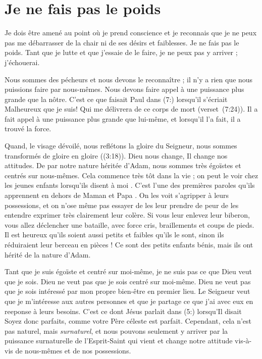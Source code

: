 \section{Je ne fais pas le poids}

Je dois être amené au point où je prend conscience et
 je reconnais que je ne peux pas me débarrasser de la chair
 ni de ses désirs et faiblesses.
 Je ne fais pas le poids. Tant que je lutte et que j'essaie de le faire,
 je ne peux pas y arriver ; j'échouerai.

Nous sommes des pécheurs et nous devons le reconnaître ;
 il n'y a rien que nous puissions faire par nous-mêmes.
 Nous devons faire appel à une puissance plus grande que la nôtre.
 C'est ce que faisait Paul dans (7:) lorsqu'il s'écriait\frcolon{}
 \Og Malheureux que je suis! Qui me délivrera de ce corps de mort \Fg{}
 (verset~(7:24)).
 Il a fait appel à une puissance plus grande que lui-même,
 et lorsqu'il l'a fait, il a trouvé la force.

\Og Quand, le visage dévoilé, nous reflétons la gloire du Seigneur,
nous sommes transformés de gloire en gloire \Fg{} ((3:18)).
 Dieu nous change, Il change nos attitudes.
 De par notre nature héritée d'Adam, nous sommes très égoïstes
 et centrés sur nous-mêmes.
 Cela commence très tôt dans la vie ; on peut le voir chez les jeunes enfants
 lorsqu'ils disent \Og à moi \Fg{}.
 C'est l'une des premières paroles qu'ils apprennent
 en dehors de \Og Maman \Fg{} et \Og Papa \Fg{}.
 On les voit s'agripper à leurs possessions, et on n'ose même pas
 essayer de les leur prendre de peur de les entendre exprimer très clairement leur colère.
 Si vous leur enlevez leur biberon, vous allez déclencher une bataille,
 avec force cris, braillements et coups de pieds.
 Il est heureux qu'ils soient aussi petits et faibles qu'ils le sont,
 sinon ils réduiraient leur berceau en pièces !
 Ce sont des petits enfants bénis,
 mais ils ont hérité de la nature d'Adam.

Tant que je suis égoïste et centré sur moi-même,
 je ne suis pas ce que Dieu veut que je sois.
 Dieu ne veut pas que je sois centré sur moi-même.
 Dieu ne veut pas que je sois intéressé par mon propre bien-être
 en premier lieu.
 Le Seigneur veut que je m'intéresse aux autres personnes et que
 je partage ce que j'ai avec eux en reeponse à leurs besoins.
 C'est ce dont Jésus parlait dans (5:) lorsqu'Il disait\frcolon{}
 \Og Soyez donc parfaits, comme votre Père céleste est parfait. \Fg{}
 Cependant, cela n'est pas naturel, mais \emph{surnaturel},
 et nous pouvons seulement
 y arriver par la puissance surnaturelle de l'Esprit-Saint
 qui vient et change notre attitude vis-à-vis de nous-mêmes
 et de nos possessions.


